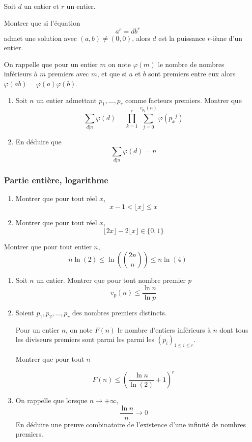 \begin{exo}
Soit $d$ un entier et $r$ un entier.

Montrer que si l'équation
$$a^r = d b^r$$
admet une solution avec $(a,b) \neq (0,0)$, alors $d$ est la puissance $r$-ième d'un entier.
\end{exo}

\begin{exo}
On rappelle que pour un entier $m$ on note $\varphi(m)$ le nombre de nombres inférieurs à $m$ premiers avec $m$, et que si $a$ et $b$ sont premiers entre eux alors $\varphi(ab) = \varphi(a) \varphi(b)$.
\begin{enumerate}
\item Soit $n$ un entier admettant $p_1,\ldots,p_r$ comme facteurs premiers. Montrer que
  $$\sum_{d | n} \varphi(d) = \prod_{k=1}^r \sum_{j=0}^{v_{p_k}(n)} \varphi({p_k}^j)$$
\item En déduire que
  $$\sum_{d | n} \varphi(d) = n$$
\end{enumerate}
\end{exo}

\subsubsection{Partie entière, logarithme}

\begin{exo}
\begin{enumerate}
\item Montrer que pour tout réel $x$,
  $$x-1 < \lfloor x \rfloor \le x$$
\item Montrer que pour tout réel $x$,
  $$\lfloor 2 x \rfloor  - 2 \lfloor x \rfloor \in \{0,1\}$$
\end{enumerate}
\end{exo}

\begin{exo}
Montrer que pour tout entier $n$,
$$n \ln(2) \le \ln \left(\binom{2n} n \right) \le n \ln(4)$$
\end{exo}


\begin{exo}
\begin{enumerate}
\item Soit $n$ un entier. Montrer que pour tout nombre premier $p$
$$v_p(n) \le \frac{\ln n}{\ln p}$$
\item Soient $p_1, p_2, \ldots, p_r$ des nombres premiers distincts.

Pour un entier $n$, on note $F(n)$ le nombre d'entiers inférieurs à $n$ dont tous les diviseurs premiers sont parmi les parmi les $(p_i)_{1 \le i \le r}$.

Montrer que pour tout $n$

$$F(n) \le \left(\frac{\ln n}{\ln(2)}+1 \right)^r$$
\item On rappelle que lorsque $n \to + \infty$,
$$\frac{\ln n} n \to 0$$
En déduire une preuve combinatoire de l'existence d'une infinité de nombres premiers.
\end{enumerate}
\end{exo}

